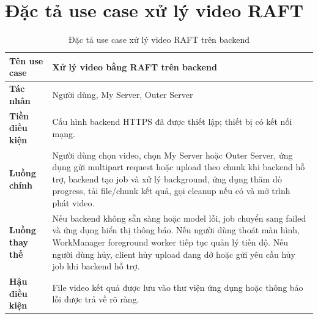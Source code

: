 \documentclass[../DoAn.tex]{subfiles}
\begin{document}
\section{Đặc tả use case xử lý video RAFT}
\begin{table}[H]
\centering
\begin{tabular}{|p{4cm}|p{9cm}|}
\hline
\textbf{Tên use case} & Xử lý video bằng RAFT trên backend \\ \hline
\textbf{Tác nhân} & Người dùng, My Server, Outer Server \\ \hline
\textbf{Tiền điều kiện} & Cấu hình backend HTTPS đã được thiết lập; thiết bị có kết nối mạng. \\ \hline
\textbf{Luồng chính} & Người dùng chọn video, chọn My Server hoặc Outer Server, ứng dụng gửi multipart request hoặc upload theo chunk khi backend hỗ trợ, backend tạo job và xử lý background, ứng dụng thăm dò progress, tải file/chunk kết quả, gọi cleanup nếu có và mở trình phát video. \\ \hline
\textbf{Luồng thay thế} & Nếu backend không sẵn sàng hoặc model lỗi, job chuyển sang failed và ứng dụng hiển thị thông báo. Nếu người dùng thoát màn hình, WorkManager foreground worker tiếp tục quản lý tiến độ. Nếu người dùng hủy, client hủy upload đang dở hoặc gửi yêu cầu hủy job khi backend hỗ trợ. \\ \hline
\textbf{Hậu điều kiện} & File video kết quả được lưu vào thư viện ứng dụng hoặc thông báo lỗi được trả về rõ ràng. \\ \hline
\end{tabular}
\caption{Đặc tả use case xử lý video RAFT trên backend}
\end{table}
\end{document}
